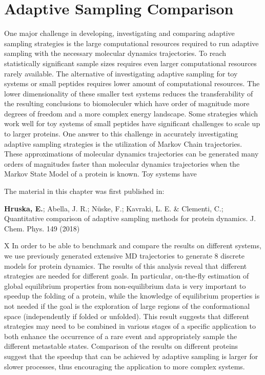 

\afterpage{\null\newpage}
\chapter{Adaptive Sampling Comparison\label{ch:chapter32}}

One major challenge in developing, investigating and comparing adaptive sampling strategies is the large computational resources required to run adaptive sampling with the necessary molecular dynamics trajectories. To reach statistically significant sample sizes requires even larger computational resources rarely available.
The alternative of investigating adaptive sampling for toy systems or small peptides requires lower amount of computational resources. The lower dimensionality of these smaller test systems reduces the transferability of the resulting conclusions to biomoleculer which have order of magnitude more degrees of freedom and a more complex energy landscape. Some strategies which work well for toy systems of small peptides have significant challenges to scale up to larger proteins. One answer to this challenge in accurately investigating adaptive sampling strategies is the utilization of Markov Chain trajectories. These approximations of molecular dynamics trajectories can be generated many orders of magnitudes faster than molecular dynamics trajectories when the Markov State Model of a protein is known. Toy systems have 

The material in this chapter was first published in: 

\cite{Adstrategies2018} \textbf{Hruska, E.}; Abella, J. R.; N\"uske, F.;
Kavraki, L. E. \& Clementi, C.; Quantitative
comparison of adaptive sampling methods
for protein dynamics. J. Chem. Phys. 149 (2018) 


X
In order to be able to benchmark and compare the results on different systems, we
use previously generated extensive MD trajectories \cite{lindorff2011} to
generate 8 discrete models for protein dynamics.
The results of this analysis reveal that different strategies are needed
for different goals. In particular, on-the-fly estimation of global
equilibrium properties from non-equilibrium data is very important to speedup
the folding of a protein, while the knowledge of equilibrium properties is not
needed if the goal is the exploration of large regions of the conformational
space (independently if folded or unfolded). This result suggests that
different strategies may need to
be combined in various stages of a specific application to both enhance the
occurrence of a rare event and appropriately sample the different metastable states.
Comparison of the results on different proteins
suggest that the speedup that can be achieved by adaptive sampling is larger
for slower processes, thus encouraging the application to more complex systems.



